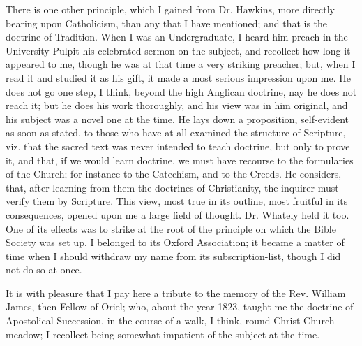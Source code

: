 There is one other principle, which I gained from Dr. Hawkins, more
directly bearing upon Catholicism, than any that I have mentioned; and
that is the doctrine of Tradition. When I was an Undergraduate, I
heard him preach in the University Pulpit his celebrated sermon on the
subject, and recollect how long it appeared to me, though he was at
that time a very striking preacher; but, when I read it and studied it
as his gift, it made a most serious impression upon me. He does not go
one step, I think, beyond the high Anglican doctrine, nay he does not
reach it; but he does his work thoroughly, and his view was in
him original, and his subject was a novel one at the
time. He lays down a proposition, self-evident as soon as stated, to
those who have at all examined the structure of Scripture, viz. that
the sacred text was never intended to teach doctrine, but only to
prove it, and that, if we would learn doctrine, we must have recourse
to the formularies of the Church; for instance to the Catechism,
and to the Creeds. He considers, that, after learning from them the
doctrines of Christianity, the inquirer must verify them by Scripture.
This view, most true in its outline, most fruitful in its
consequences, opened upon me a large field of thought. Dr. Whately
held it too. One of its effects was to strike at the root of the
principle on which the Bible Society was set up. I belonged to its
Oxford Association; it became a matter of time when I should withdraw
my name from its subscription-list, though I did not do so at once.

It is with pleasure that I pay here a tribute to the memory of the
Rev. William James, then Fellow of Oriel; who, about the year 1823,
taught me the doctrine of Apostolical Succession, in the course of a
walk, I think, round Christ Church meadow; I recollect being somewhat
impatient of the
subject at the time.

